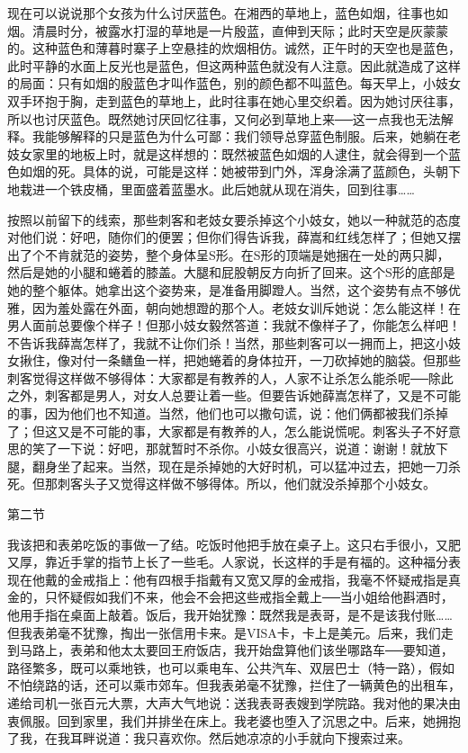 现在可以说说那个女孩为什么讨厌蓝色。在湘西的草地上，蓝色如烟，往事也如烟。清晨时分，被露水打湿的草地是一片殷蓝，直伸到天际；此时天空是灰蒙蒙的。这种蓝色和薄暮时寨子上空悬挂的炊烟相仿。诚然，正午时的天空也是蓝色，此时平静的水面上反光也是蓝色，但这两种蓝色就没有人注意。因此就造成了这样的局面：只有如烟的殷蓝色才叫作蓝色，别的颜色都不叫蓝色。每天早上，小妓女双手环抱于胸，走到蓝色的草地上，此时往事在她心里交织着。因为她讨厌往事，所以也讨厌蓝色。既然她讨厌回忆往事，又何必到草地上来──这一点我也无法解释。我能够解释的只是蓝色为什么可鄙：我们领导总穿蓝色制服。后来，她躺在老妓女家里的地板上时，就是这样想的：既然被蓝色如烟的人逮住，就会得到一个蓝色如烟的死。具体的说，可能是这样：她被带到门外，浑身涂满了蓝颜色，头朝下地栽进一个铁皮桶，里面盛着蓝墨水。此后她就从现在消失，回到往事…… 

按照以前留下的线索，那些刺客和老妓女要杀掉这个小妓女，她以一种就范的态度对他们说：好吧，随你们的便罢；但你们得告诉我，薛嵩和红线怎样了；但她又摆出了个不肯就范的姿势，整个身体呈S形。在S形的顶端是她捆在一处的两只脚，然后是她的小腿和蜷着的膝盖。大腿和屁股朝反方向折了回来。这个S形的底部是她的整个躯体。她拿出这个姿势来，是准备用脚蹬人。当然，这个姿势有点不够优雅，因为羞处露在外面，朝向她想蹬的那个人。老妓女训斥她说：怎么能这样！在男人面前总要像个样子！但那小妓女毅然答道：我就不像样子了，你能怎么样吧！不告诉我薛嵩怎样了，我就不让你们杀！当然，那些刺客可以一拥而上，把这小妓女揪住，像对付一条鳝鱼一样，把她蜷着的身体拉开，一刀砍掉她的脑袋。但那些刺客觉得这样做不够得体：大家都是有教养的人，人家不让杀怎么能杀呢──除此之外，刺客都是男人，对女人总要让着一些。但要告诉她薛嵩怎样了，又是不可能的事，因为他们也不知道。当然，他们也可以撒句谎，说：他们俩都被我们杀掉了；但这又是不可能的事，大家都是有教养的人，怎么能说慌呢。刺客头子不好意思的笑了一下说：好吧，那就暂时不杀你。小妓女很高兴，说道：谢谢！就放下腿，翻身坐了起来。当然，现在是杀掉她的大好时机，可以猛冲过去，把她一刀杀死。但那刺客头子又觉得这样做不够得体。所以，他们就没杀掉那个小妓女。 

第二节 

我该把和表弟吃饭的事做一了结。吃饭时他把手放在桌子上。这只右手很小，又肥又厚，靠近手掌的指节上长了一些毛。人家说，长这样的手是有福的。这种福分表现在他戴的金戒指上：他有四根手指戴有又宽又厚的金戒指，我毫不怀疑戒指是真金的，只怀疑假如我们不来，他会不会把这些戒指全戴上──当小姐给他斟酒时，他用手指在桌面上敲着。饭后，我开始犹豫：既然我是表哥，是不是该我付账……但我表弟毫不犹豫，掏出一张信用卡来。是VISA卡，卡上是美元。后来，我们走到马路上，表弟和他太太要回王府饭店，我开始盘算他们该坐哪路车──要知道，路径繁多，既可以乘地铁，也可以乘电车、公共汽车、双层巴士（特一路），假如不怕绕路的话，还可以乘市郊车。但我表弟毫不犹豫，拦住了一辆黄色的出租车，递给司机一张百元大票，大声大气地说：送我表哥表嫂到学院路。我对他的果决由衷佩服。回到家里，我们并排坐在床上。我老婆也堕入了沉思之中。后来，她拥抱了我，在我耳畔说道：我只喜欢你。然后她凉凉的小手就向下搜索过来。 

